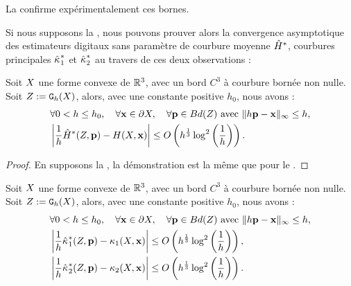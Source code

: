 La  confirme expérimentalement ces bornes.


Si nous supposons la , nous pouvons prouver
alors la convergence asymptotique des estimateurs digitaux sans paramètre de
courbure moyenne $\hat{H}^{*}$, courbures principales $\hat{\kappa_{}}_{1}^{*}$ et
$\hat{\kappa_{}}_{2}^{*}$ au travers de ces deux observations :
%
\begin{observation}{}
  \label{obs:curvature-estimator-3d-mean-pf-conv}
  Soit $X$ une forme convexe de $\mathbb{R}^3$, avec un bord $C^3$ à
  courbure bornée non nulle. Soit $Z := \mathtt{G}_{h}(X)$, alors, avec une
  constante positive $h_0$, nous avons :
  \begin{align}
    &\forall 0 < h \le h_0, \quad \forall \mathbf{x} \in \partial X, \quad \forall \mathbf{p} \in Bd({Z}) \text{~avec~} \| h\mathbf{p} -\mathbf{x}\|_\infty \le h, \nonumber\\
    &\left | \frac{1}{h}\hat{H}^{*}(Z,\mathbf{p}) - H(X,\mathbf{x}) \right| \le O\left( h^{\frac{1}{3}} \log^2 \left(\frac{1}{h}\right)\right) .
  \end{align}
\end{observation}
\begin{proof}
  En supposons la , la démonstration est la
  même que pour le .
\end{proof}
%
\begin{observation}{}
  \label{obs:curvature-estimator-3d-k1k2-pf-conv}
  Soit $X$ une forme convexe de $\mathbb{R}^3$, avec un bord $C^3$ à
  courbure bornée non nulle. Soit $Z := \mathtt{G}_{h}(X)$, alors, avec une
  constante positive $h_0$, nous avons :
  \begin{align}
    &\forall 0 < h \le h_0, \quad \forall \mathbf{x} \in \partial X, \quad \forall \mathbf{p} \in Bd({Z}) \text{~avec~} \| h\mathbf{p} -\mathbf{x}\|_\infty \le h, \nonumber\\
    &\left | \frac{1}{h}\hat{\kappa_{}}_{1}^{*}(Z,\mathbf{p}) - \kappa_{1}(X,\mathbf{x}) \right| \le O\left( h^{\frac{1}{3}} \log^2 \left(\frac{1}{h}\right)\right) ,\\
    &\left | \frac{1}{h}\hat{\kappa_{}}_{2}^{*}(Z,\mathbf{p}) - \kappa_{2}(X,\mathbf{x}) \right| \le O\left( h^{\frac{1}{3}} \log^2 \left(\frac{1}{h}\right)\right) .
  \end{align}
\end{observation}
